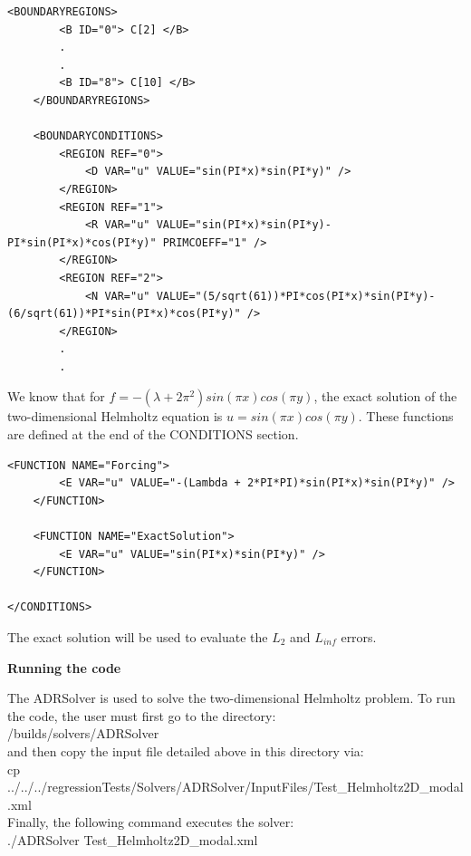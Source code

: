 \begin{lstlisting}[style=XMLStyle]
<BOUNDARYREGIONS>
        <B ID="0"> C[2] </B>
        .
        .
        <B ID="8"> C[10] </B>
    </BOUNDARYREGIONS>

    <BOUNDARYCONDITIONS>
        <REGION REF="0">
            <D VAR="u" VALUE="sin(PI*x)*sin(PI*y)" />
        </REGION>
        <REGION REF="1">
            <R VAR="u" VALUE="sin(PI*x)*sin(PI*y)-PI*sin(PI*x)*cos(PI*y)" PRIMCOEFF="1" />
        </REGION>
        <REGION REF="2">
            <N VAR="u" VALUE="(5/sqrt(61))*PI*cos(PI*x)*sin(PI*y)-(6/sqrt(61))*PI*sin(PI*x)*cos(PI*y)" />
        </REGION>
        .
        .
\end{lstlisting}

We know that for $f = -(\lambda + 2 \pi^2)sin(\pi x)cos(\pi y)$, the exact solution of the two-dimensional 
Helmholtz equation is $u = sin(\pi x)cos(\pi y)$. These functions are defined at the end of the CONDITIONS section.

\begin{lstlisting}[style=XMLStyle]
<FUNCTION NAME="Forcing">
        <E VAR="u" VALUE="-(Lambda + 2*PI*PI)*sin(PI*x)*sin(PI*y)" />
    </FUNCTION>

    <FUNCTION NAME="ExactSolution">
        <E VAR="u" VALUE="sin(PI*x)*sin(PI*y)" />
    </FUNCTION>

</CONDITIONS>
\end{lstlisting}

The exact solution will be used to evaluate the $L_2$ and $L_{inf}$ errors.

\textbf{Running the code}

The ADRSolver is used to solve the two-dimensional Helmholtz problem. To run the code, the user must first go to the directory: \\

\nekpp/builds/solvers/ADRSolver \\ 

and then copy the input file detailed above in this directory via: \\

cp ../../../regressionTests/Solvers/ADRSolver/InputFiles/Test\_Helmholtz2D\_modal.xml \\

Finally, the following command executes the solver: \\

./ADRSolver Test\_Helmholtz2D\_modal.xml \\

